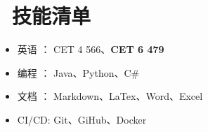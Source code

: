 \documentclass{resume}
\begin{document}
\section{\faCogs\ 技能清单}
\begin{itemize}[parsep=0.5ex]
  \item 英语 ：		   CET 4 566、\textbf{CET 6 479}
  \item 编程 ：		   Java、Python、C\#
  \item 文档 ：		   Markdown、LaTex、Word、Excel
  \item CI/CD:		  Git、GiHub、Docker
  
\end{itemize}



%
%
\end{document}
